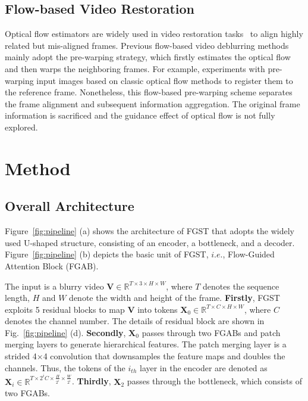 \documentclass{article}
\begin{document}
	\vspace{-1mm}
	\subsection{Flow-based Video Restoration}
	\vspace{-1mm}
	Optical flow estimators are widely used in video restoration tasks~\cite{gast2019deep,xue2019video,gong2017motion,sun2015learning,makansi2017end,Su,tsp} to align highly related but mis-aligned frames. Previous flow-based video deblurring  methods~\cite{xue2019video,makansi2017end,Su,tsp,gast2019deep} mainly adopt the pre-warping strategy, which firstly estimates the optical flow and then warps the neighboring frames. For example, \cite{Su} experiments with pre-warping input images based on classic optical flow methods to register them to the reference frame. Nonetheless, this flow-based pre-warping scheme separates the frame alignment and subsequent information aggregation. The original frame information is sacrificed and the guidance effect of optical flow is not fully explored. 
	
	\vspace{-1.5mm}
	\section{Method}
	\vspace{-0.5mm}
	\subsection{Overall Architecture}
	Figure~\ref{fig:pipeline} (a) shows the architecture of FGST that adopts the widely used U-shaped structure, consisting of an encoder, a bottleneck, and a decoder. Figure~\ref{fig:pipeline} (b) depicts the basic unit of FGST, $i.e.$, Flow-Guided Attention Block (FGAB). 
	
	The input is a blurry video $\mathbf{V}\in \mathbb{R}^{T\times 3\times H \times W}$, where $T$ denotes the sequence length, $H$ and $W$ denote the width and height of the frame. \textbf{Firstly}, FGST exploits 5 residual blocks to map $\mathbf{V}$ into tokens $\mathbf{X}_0\in \mathbb{R}^{T\times C\times H \times W}$, where $C$ denotes the channel number. The details of residual block are shown in Fig.~\ref{fig:pipeline} (d). \textbf{Secondly}, $\mathbf{X}_0$ passes through two FGABs and patch merging layers to generate hierarchical features. The patch merging layer is a strided 4$\times$4 convolution that downsamples the feature maps and doubles the channels. Thus, the  tokens of the $i_{th}$ layer in the encoder are denoted as $\mathbf{X}_i\in \mathbb{R}^{T\times 2^{i}C\times \frac{H}{2^{i}} \times \frac{W}{2^{i}}}$. \textbf{Thirdly}, $\mathbf{X}_2$ passes through the bottleneck, which consists of two FGABs.
	
\end{document}
